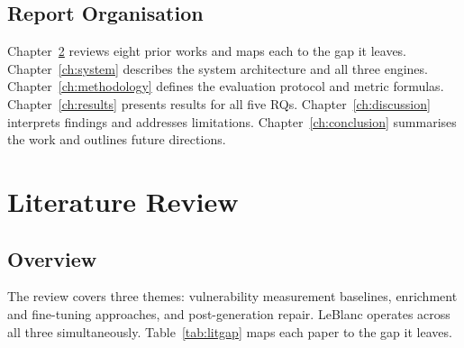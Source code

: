 \documentclass[12pt,a4paper]{report}
\begin{document}
\section{Report Organisation}
\label{sec:organisation}

Chapter~\ref{ch:literature} reviews eight prior works and maps each to the gap it
leaves. Chapter~\ref{ch:system} describes the system architecture and all three
engines. Chapter~\ref{ch:methodology} defines the evaluation protocol and metric
formulas. Chapter~\ref{ch:results} presents results for all five RQs.
Chapter~\ref{ch:discussion} interprets findings and addresses limitations.
Chapter~\ref{ch:conclusion} summarises the work and outlines future directions.

\chapter{Literature Review}
\label{ch:literature}

\section{Overview}
\label{sec:litoverview}

The review covers three themes: vulnerability measurement baselines, enrichment
and fine-tuning approaches, and post-generation repair. LeBlanc operates across
all three simultaneously. Table~\ref{tab:litgap} maps each paper to the gap it
leaves.
\end{document}
